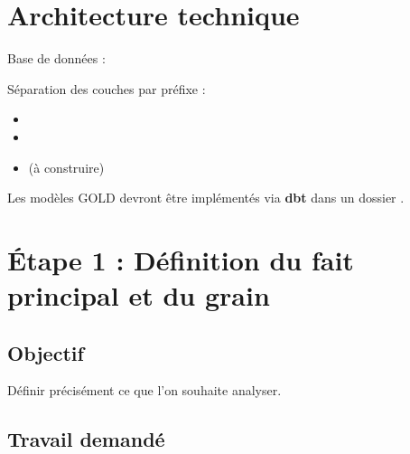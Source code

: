 \documentclass[11pt,a4paper]{article}
\begin{document}

\section*{Architecture technique}

Base de données : 

Séparation des couches par préfixe :

\begin{itemize}
  \item {}
  \item {}
  \item {} (à construire)
\end{itemize}

Les modèles GOLD devront être implémentés via \textbf{dbt}
dans un dossier .


\section{Étape 1 : Définition du fait principal et du grain}

\subsection*{Objectif}

Définir précisément ce que l’on souhaite analyser.

\subsection*{Travail demandé}
\end{document}
